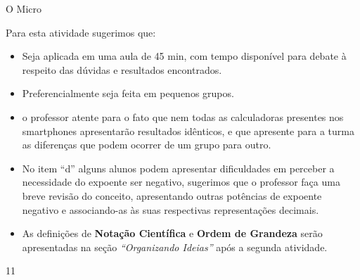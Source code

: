 \begin{sugestions}{O Micro}
{
Para esta atividade sugerimos que:
\begin{itemize}
\item {} 
Seja aplicada em uma aula de 45 min, com tempo disponível para debate à respeito das dúvidas e resultados encontrados.

\item {} 
Preferencialmente seja feita em pequenos grupos.

\item {} 
o professor atente para o fato que nem todas as calculadoras presentes nos smartphones apresentarão resultados idênticos, e que apresente para a turma as diferenças que podem ocorrer de um grupo para outro.

\item {} 
No item “d” alguns alunos podem apresentar dificuldades em perceber a necessidade do expoente ser negativo, sugerimos que o professor faça uma breve revisão do conceito, apresentando outras potências de expoente negativo e associando-as às suas respectivas representações decimais.

\item {} 
As definições de \textbf{Notação Científica} e \textbf{Ordem de Grandeza} serão apresentadas na seção \textit{“Organizando Ideias”} após a segunda atividade.

\end{itemize}
}{1}{1}
\end{sugestions}
